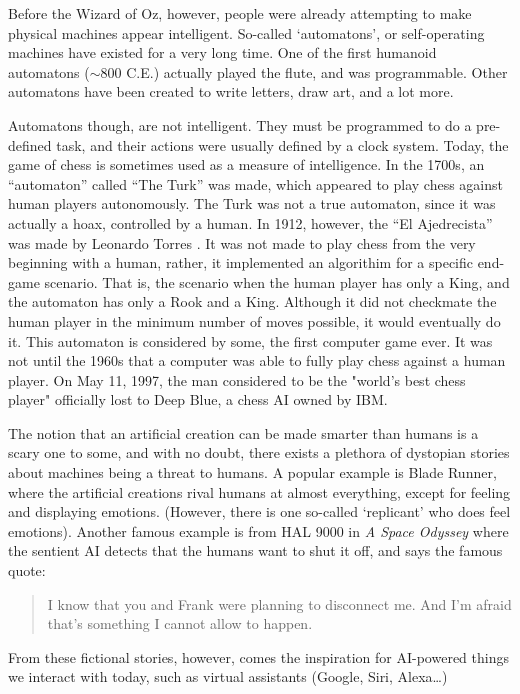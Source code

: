 \documentclass[letterpaper,12pt]{article}
\begin{document}
Before the Wizard of Oz, however, people were already attempting to make physical machines
appear intelligent. So-called `automatons', or self-operating machines have existed for
a very long time. One of the first humanoid automatons ($\sim$800 C.E.) actually played the flute, and was programmable.\cite{automaton}
Other automatons have been created to write letters, draw art, and a lot more.

Automatons though, are not intelligent.
They must be programmed to do a pre-defined task, and their actions were
usually defined by a clock system.
Today, the game of chess is sometimes used as a measure of intelligence.
In the 1700s, an ``automaton'' called ``The Turk'' was made, which appeared to play chess
against human players autonomously\cite{turk}. The Turk was not a true automaton, since
it was actually a hoax, controlled by a human. In 1912, however, the ``El Ajedrecista''
was made by Leonardo Torres \cite{actualchessmachine}. It was not made to play chess from the
very beginning with a human, rather, it implemented an algorithim for a
specific end-game scenario. That is, the scenario when the human player has
only a King, and the automaton has only a Rook and a King. Although it did not
checkmate the human player in the minimum number of moves possible, it would
eventually do it.
This automaton is considered by some, the first computer game ever.
It was not until the 1960s that a computer was able to fully play chess against a human player.\cite{computerchess}
On May 11, 1997, the man considered to be the "world's best chess player" officially lost to Deep Blue,
a chess AI owned by IBM.\cite{computerchess}


The notion that an artificial creation can be made smarter than humans is a scary one to some,
and with no doubt, there exists a plethora of dystopian stories about machines being a threat to humans.
A popular example is Blade Runner, where the artificial creations rival humans
at almost everything, except for feeling and displaying emotions. (However, there is one so-called `replicant'
who does feel emotions)\cite{bladerunner}. Another famous example is from HAL 9000 in \textit{A Space Odyssey}
where the sentient AI detects that the humans want to shut it off, and says the
famous quote\cite{HAL}: 
\begin{quote}
   I know that you and Frank were planning to disconnect me. And I'm afraid that's something I cannot allow to happen.
\end{quote}

From these fictional stories, however, comes the inspiration for AI-powered things we interact with
today, such as virtual assistants (Google, Siri, Alexa\dots) 
\end{document}
